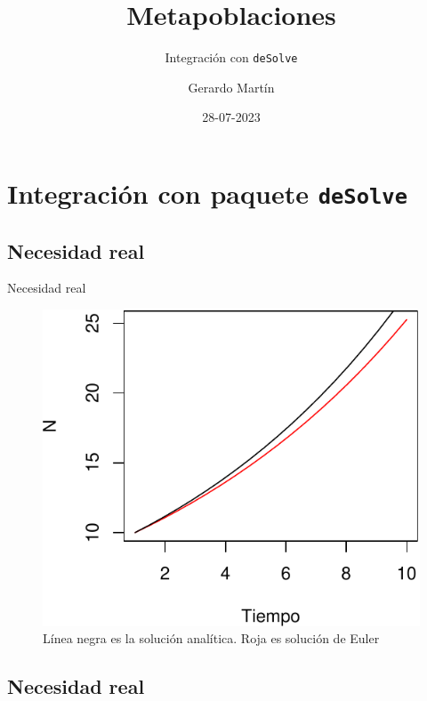 \documentclass[
  11pt,
  ignorenonframetext,
]{beamer}
\title{Metapoblaciones}
\subtitle{Integración con \texttt{deSolve}}
\author{Gerardo Martín}
\date{28-07-2023}
\begin{document}
\frame{\titlepage}

\hypertarget{integraciuxf3n-con-paquete-desolve}{%
\section{\texorpdfstring{Integración con paquete
\texttt{deSolve}}{Integración con paquete deSolve}}\label{integraciuxf3n-con-paquete-desolve}}

\hypertarget{necesidad-real}{%
\subsection{Necesidad real}\label{necesidad-real}}

\begin{frame}{Necesidad real}
\begin{figure}
\centering
\includegraphics{deSolve_files/figure-beamer/unnamed-chunk-1-1.pdf}
\caption{Línea negra es la solución analítica. Roja es solución de
Euler}
\end{figure}
\end{frame}

\hypertarget{necesidad-real-1}{%
\subsection{Necesidad real}\label{necesidad-real-1}}
\end{document}
